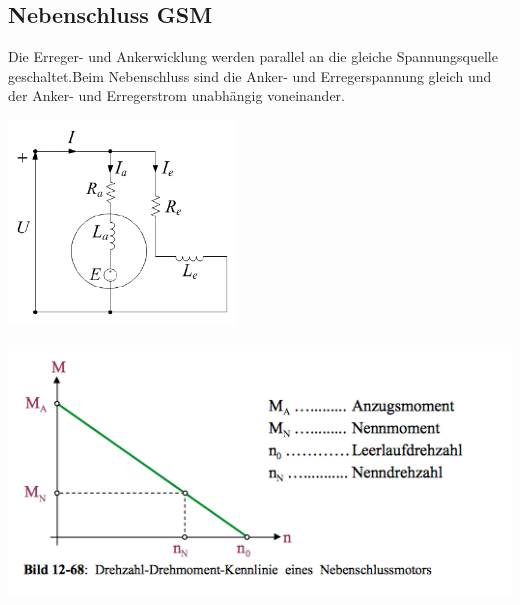 \subsection{Nebenschluss GSM}
Die Erreger- und Ankerwicklung werden parallel an die gleiche Spannungsquelle geschaltet.\newline Beim Nebenschluss sind die Anker- und Erregerspannung gleich und der Anker- und Erregerstrom unabhängig \newline voneinander. \\
\begin{minipage}[b]{0.4\textwidth}
	\raggedright
	\includegraphics[width=6cm]{images/Nebenschluss_GSM.png}
\end{minipage}
\begin{minipage}[b]{0.5\textwidth}
	\raggedright
	\includegraphics[scale = 0.6]{images/KennlinieNebenschluss}
\end{minipage}\\

